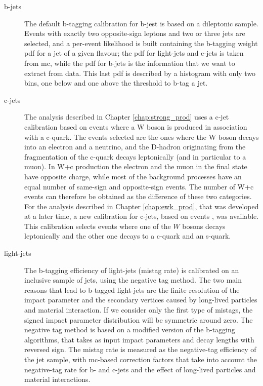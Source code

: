 \begin{description}

\item[b-jets] The default b-tagging calibration for b-jest is based on a \ttbar dileptonic sample. Events with exactly two opposite-sign leptons
and two or three jets are selected, and a per-event likelihood is built containing the b-tagging weight \gls{pdf} for a jet of a given flavour;
the \gls{pdf} for light-jets and c-jets is taken from \gls{mc}, while the \gls{pdf} for b-jets is the information that we want to extract from data.
This last \gls{pdf} is described by a histogram with only two bins, one below and one above the threshold to b-tag a jet. 


\item[c-jets] The analysis described in Chapter \ref{chap:strong_prod} uses a c-jet calibration based on events where a W boson 
is produced in association with a c-quark. The events selected are the ones where the W boson decays into an electron and a neutrino,
and the D-hadron originating from the fragmentation of the c-quark decays leptonically (and in particular to a muon). 
In W+c production the electron and the muon in the final state have opposite charge, 
while most of the background processes have an equal number of same-sign and opposite-sign events. The number of W+c events can therefore 
be obtained as the difference of these two categories.
For the analysis described in Chapter \ref{chap:ewk_prod}, that was developed at a later time, a new calibration for c-jets, 
based on \ttbar events \cite{ATLAS:2018bpl}, was available. 
This calibration selects \ttbar events where one of the $W$ bosons decays leptonically and the other one decays to a c-quark and an s-quark. 

\item[light-jets] The b-tagging efficiency of light-jets (mistag rate) is calibrated on an inclusive sample of jets, using the negative tag method.
The two main reasons that lead to b-tagged light-jets are the finite resolution of the impact parameter and the secondary vertices caused
by long-lived particles and material interaction. If we consider only the first type of mistags, the signed impact parameter distribution 
will be symmetric around zero. 
The negative tag method is based on a modified version of the b-tagging algorithms, that takes as input impact parameters and decay lengths with
reversed sign. The mistag rate is measured as the negative-tag efficiency of the jet sample, with \gls{mc}-based correction factors that take into account 
the negative-tag rate for b- and c-jets and the effect of long-lived particles and material interactions.

\end{description}

